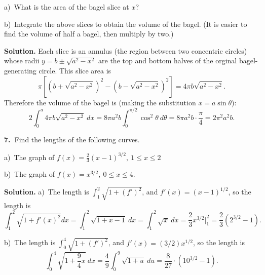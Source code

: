 \documentclass[12pt]{article}
\theoremstyle{definition}
\theoremstyle{remark}
\theoremstyle{definition}
\newenvironment{Solution}{\noindent\textbf{Solution.}}{}
\begin{document}
a)\ What is the area of the bagel slice at $x$? 

b)\ Integrate the above slices to obtain the volume of the bagel. 
(It is easier to find the volume of half a bagel, then multiply by two.)

\begin{Solution} Each slice is an annulus (the region between two concentric circles)
whose radii $y=b\pm\sqrt{a^2-x^2}$ are the top and bottom halves of the orginal bagel-generating circle.  This slice area is 
\[
\pi\left[(b+\sqrt{a^2-x^2})^2-(b-\sqrt{a^2-x^2})^2\right]=
4\pi b\sqrt{a^2-x^2}.
\]
Therefore the volume of the bagel is 
(making the substitution $x=a\sin\theta$):
\[
2\int_0^a4\pi b\sqrt{a^2-x^2}\ dx=
8\pi a^2 b\int_0^{\pi/2} \cos^2\theta\ d\theta=
8\pi a^2 b\cdot \frac{\pi}{4}=2\pi^2 a^2b.
\]
\end{Solution}

{\bf 7.\ }Find the lengths of the following curves.  

a)\ The graph of $f(x)=\frac{2}{3}(x-1)^{3/2},\ 1\leq x\leq 2$

b)\  The graph of $f(x)=x^{3/2},\ 0\leq x\leq 4$.



\begin{Solution} a)\ The length is $\int_1^2 \sqrt{1+(f')^2}$, and
$f'(x)=(x-1)^{1/2}$, so the length is
\[
\int_1^2\sqrt{1+f'(x)^2} dx=
\int_1^2\sqrt{1+x-1}\ dx=\int_1^2\sqrt{x}\ dx=
\frac{2}{3} x^{3/2}\bigg\vert_1^2=
\frac{2}{3}\left(2^{3/2}-1\right).
\]

b)\ The length is $\int_0^4\sqrt{1+(f')^2}$, and 
$f'(x)=(3/2)x^{1/2}$, so the length is 
\[
\int_0^4\sqrt{1+\frac{9}{4} x}\ dx=
\frac{4}{9}\int_0^9 \sqrt{1+u}\ du=
\frac{8}{27}\cdot \left(10^{3/2}-1\right).
\]

\end{Solution}
\end{document}
